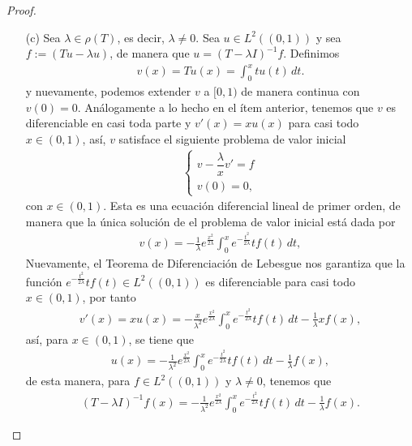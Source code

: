 \begin{proof}
\begin{enumerate}
        \item[(c)] Sea $\lambda \in \rho(T)$, es decir, $\lambda\neq 0$. Sea $u \in L^2((0,1))$ y sea $f:=(Tu-\lambda u)$, de manera que $u=(T-\lambda I)^{-1}f$. Definimos 
        \begin{align*}
            v(x)=Tu(x)=\int_0^x tu(t)\, dt.
        \end{align*}
        y nuevamente, podemos extender $v$ a $[0,1)$ de manera continua con $v(0)=0$.
        Análogamente a lo hecho en el ítem anterior, tenemos que $v$ es diferenciable en casi toda parte y $v'(x)=xu(x)$ para casi todo $x \in (0,1)$, así, $v$ satisface el siguiente problema de valor inicial 
        \begin{align*}
            \begin{cases}
                v-\dfrac{\lambda}{x}v'=f\\
                v(0)=0,
            \end{cases}
        \end{align*}
        con $x \in (0,1)$. Esta es una ecuación diferencial lineal de primer orden, de manera que la única solución de el problema de valor inicial está dada por
        \begin{align*}
            v(x)=-\frac{1}{\lambda}e^{\frac{x^2}{2\lambda}}\int_0^x e^{-\frac{t^2}{2\lambda}}tf(t)\, dt, 
        \end{align*}
        Nuevamente, el Teorema de Diferenciación de Lebesgue nos garantiza que la función $e^{-\frac{t^2}{2\lambda}}tf(t)\in L^2((0,1))$ es diferenciable para casi todo $x \in (0,1)$, por tanto
        \begin{align*}
            v'(x)=xu(x)=-\frac{x}{\lambda^2}e^{\frac{x^2}{2\lambda}}\int_0^x e^{-\frac{t^2}{2\lambda}}tf(t)\, dt-\frac{1}{\lambda}xf(x),
        \end{align*}
        así, para $x \in (0,1)$, se tiene que
        \begin{align*}
            u(x)=-\frac{1}{\lambda^2}e^{\frac{x^2}{2\lambda}}\int_0^x e^{-\frac{t^2}{2\lambda}}tf(t)\, dt-\frac{1}{\lambda}f(x),
        \end{align*}
        de esta manera, para $f \in L^2((0,1))$ y $\lambda\neq 0$, tenemos que 
        \begin{align*}
            (T-\lambda I)^{-1}f(x)=-\frac{1}{\lambda^2}e^{\frac{x^2}{2\lambda}}\int_0^x e^{-\frac{t^2}{2\lambda}}tf(t)\, dt-\frac{1}{\lambda}f(x).
        \end{align*}


\end{enumerate}
\end{proof}
